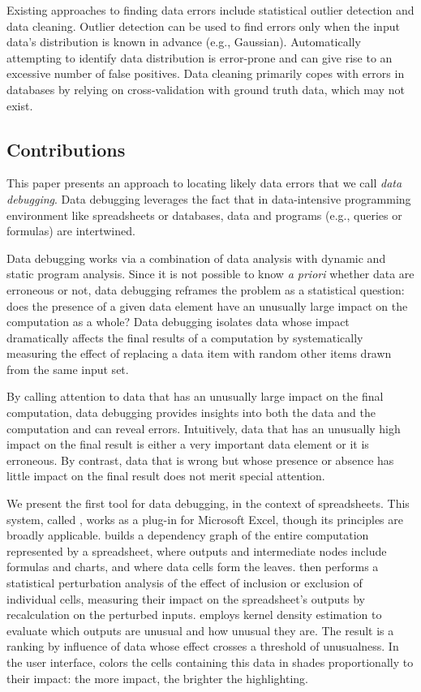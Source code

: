 
Existing approaches to finding data errors include statistical outlier
detection and data cleaning. Outlier detection can be used to find
errors only when the input data's distribution is known in advance
(e.g., Gaussian). Automatically attempting to identify data
distribution is error-prone and can give rise to an excessive number
of false positives. Data cleaning primarily copes with errors in
databases by relying on cross-validation with ground truth data, which
may not exist.

\subsection*{Contributions}

This paper presents an approach to locating likely data errors that we
call \emph{data debugging}. Data debugging leverages the fact that in
data-intensive programming environment like spreadsheets or databases,
data and programs (e.g., queries or formulas) are intertwined.

Data debugging works via a combination of data analysis with dynamic
and static program analysis.  Since it is not possible to know \emph{a
priori} whether data are erroneous or not, data debugging reframes the
problem as a statistical question: does the presence of a given data
element have an unusually large impact on the computation as a whole?
Data debugging isolates data whose impact dramatically
affects the final results of a computation by systematically measuring
the effect of replacing a data item with random other items drawn from the
same input set.

By calling attention to data that has an unusually large impact on the
final computation, data debugging provides insights into both the data
and the computation and can reveal errors. Intuitively, data that has
an unusually high impact on the final result is either a very
important data element or it is erroneous. By contrast, data that is
wrong but whose presence or absence has little impact on the final
result does not merit special attention.

We present the first tool for data debugging, in the context of
spreadsheets. This system, called \checkcell{}, works as a plug-in for
Microsoft Excel, though its principles are broadly
applicable. \checkcell{} builds a dependency graph of the entire
computation represented by a spreadsheet, where outputs and
intermediate nodes include formulas and charts, and where data cells
form the leaves. \checkcell{} then performs a statistical perturbation
analysis of the effect of inclusion or exclusion of individual cells,
measuring their impact on the spreadsheet's outputs by recalculation
on the perturbed inputs. \checkcell{} employs kernel density
estimation to evaluate which outputs are unusual and how unusual they
are. The result is a ranking by influence of data whose effect crosses
a threshold of unusualness. In the user interface, \checkcell{} colors
the cells containing this data in shades proportionally to their
impact: the more impact, the brighter the highlighting.

